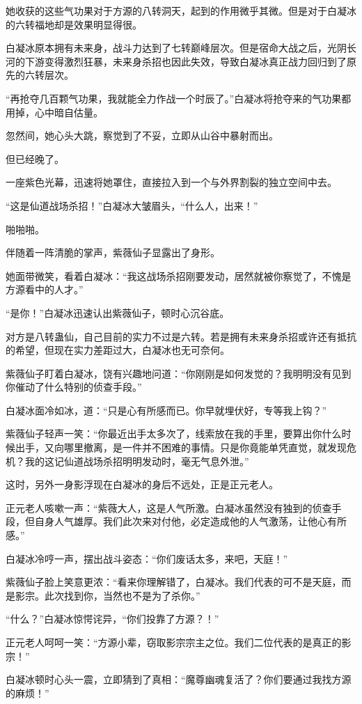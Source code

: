 \begin{this_body}
她收获的这些气功果对于方源的八转洞天，起到的作用微乎其微。但是对于白凝冰的六转福地却是效果明显得很。

白凝冰原本拥有未来身，战斗力达到了七转巅峰层次。但是宿命大战之后，光阴长河的下游变得激烈狂暴，未来身杀招也因此失效，导致白凝冰真正战力回归到了原先的六转层次。

“再抢夺几百颗气功果，我就能全力作战一个时辰了。”白凝冰将抢夺来的气功果都用掉，心中暗自估量。

忽然间，她心头大跳，察觉到了不妥，立即从山谷中暴射而出。

但已经晚了。

一座紫色光幕，迅速将她罩住，直接拉入到一个与外界割裂的独立空间中去。

“这是仙道战场杀招！”白凝冰大皱眉头，“什么人，出来！”

啪啪啪。

伴随着一阵清脆的掌声，紫薇仙子显露出了身形。

她面带微笑，看着白凝冰：“我这战场杀招刚要发动，居然就被你察觉了，不愧是方源看中的人才。”

“是你！”白凝冰迅速认出紫薇仙子，顿时心沉谷底。

对方是八转蛊仙，自己目前的实力不过是六转。若是拥有未来身杀招或许还有抵抗的希望，但现在实力差距过大，白凝冰也无可奈何。

紫薇仙子盯着白凝冰，饶有兴趣地问道：“你刚刚是如何发觉的？我明明没有见到你催动了什么特别的侦查手段。”

白凝冰面冷如冰，道：“只是心有所感而已。你早就埋伏好，专等我上钩？”

紫薇仙子轻声一笑：“你最近出手太多次了，线索放在我的手里，要算出你什么时候出手，又向哪里撤离，是一件并不困难的事情。只是你竟能单凭直觉，就发现危机？我的这记仙道战场杀招明明发动时，毫无气息外泄。”

这时，另外一身影浮现在白凝冰的身后不远处，正是正元老人。

正元老人咳嗽一声：“紫薇大人，这是人气所激。白凝冰虽然没有独到的侦查手段，但自身人气雄厚。我们此次来对付他，必定造成他的人气激荡，让他心有所感。”

白凝冰冷哼一声，摆出战斗姿态：“你们废话太多，来吧，天庭！”

紫薇仙子脸上笑意更浓：“看来你理解错了，白凝冰。我们代表的可不是天庭，而是影宗。此次找到你，当然也不是为了杀你。”

“什么？”白凝冰惊愕诧异，“你们投靠了方源？！”

正元老人呵呵一笑：“方源小辈，窃取影宗宗主之位。我们二位代表的是真正的影宗！”

白凝冰顿时心头一震，立即猜到了真相：“魔尊幽魂复活了？你们要通过我找方源的麻烦！”


\end{this_body}
